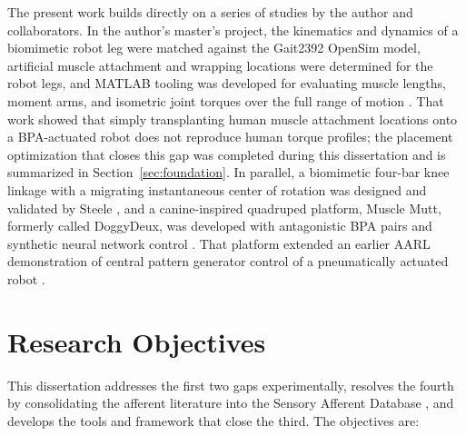 The present work builds directly on a series of studies by the author and collaborators. In the author's master's project, the kinematics and dynamics of a biomimetic robot leg were matched against the Gait2392 OpenSim model, artificial muscle attachment and wrapping locations were determined for the robot legs, and MATLAB tooling was developed for evaluating muscle lengths, moment arms, and isometric joint torques over the full range of motion \citep{bolen_bipedal_2019, bolen_determination_2019}. That work showed that simply transplanting human muscle attachment locations onto a BPA-actuated robot does not reproduce human torque profiles; the placement optimization that closes this gap was completed during this dissertation and is summarized in Section~\ref{sec:foundation}. In parallel, a biomimetic four-bar knee linkage with a migrating instantaneous center of rotation was designed and validated by Steele \citep{steele_development_2017, steele_biomimetic_2018, steele_biomimetic_2018-1}, and a canine-inspired quadruped platform, Muscle Mutt, formerly called DoggyDeux, was developed with antagonistic BPA pairs and synthetic neural network control \citep{scharzenberger_design_2019}. That platform extended an earlier AARL demonstration of central pattern generator control of a pneumatically actuated robot \citep{hunt_development_2017}.

\section{Research Objectives}\label{sec:objectives}

This dissertation addresses the first two gaps experimentally, resolves the fourth by consolidating the afferent literature into the Sensory Afferent Database \citep{bolen_sensory_2023, bolen_using_2024}, and develops the tools and framework that close the third. The objectives are:

